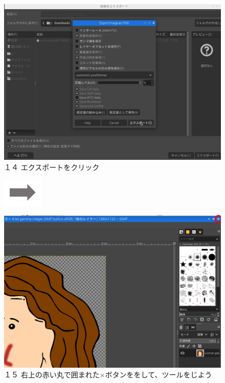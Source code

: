 \documentclass[a4paper,12pt]{jarticle}
\begin{document}
\begin{figure}
  \bigskip


  \begin{minipage}{\textwidth}
    \begin{minipage}{0.45\textwidth}
      \includegraphics[width=\linewidth]{textbook-img134.png}\\
      １４ エクスポートをクリック
    \end{minipage}
    \includegraphics[width=1.919cm]{textbook-img135.png}
    \begin{minipage}{0.45\textwidth}
      \includegraphics[width=\linewidth]{textbook-img1030.png}\\
      １５
      右上の赤い丸で囲まれた×ボタンををして、ツールをじよう
    \end{minipage}
  \end{minipage}



\end{figure}
\clearpage
\end{document}
